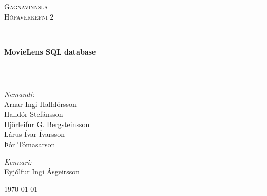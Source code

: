 \newcommand{\HRule}{\rule{\linewidth}{0.5mm}}

\begin{titlepage}

\begin{center}


\textsc{\LARGE Gagnavinnsla}\\[0.5cm]
\textsc{\Large Hópaverkefni 2}\\[0.6cm]

\HRule \\[0.4cm]
{ \Huge \bfseries MovieLens SQL database}\\[0.2cm]

\HRule \\[1.5cm]


\begin{minipage}{0.49\textwidth}
\begin{flushleft} \large
\emph{Nemandi:}\\
Arnar Ingi Halldórsson\\
Halldór Stefánsson\\
Hjörleifur G. Bergsteinsson\\
Lárus Ívar Ívarsson\\
Þór Tómasarson
\end{flushleft}
\end{minipage}
\begin{minipage}{0.49\textwidth}
\begin{flushright} \large
\emph{Kennari:} \\
Eyjólfur Ingi Ásgeirsson
\end{flushright}
\end{minipage}

\vfill

{\large \today}



\end{center}

\end{titlepage}